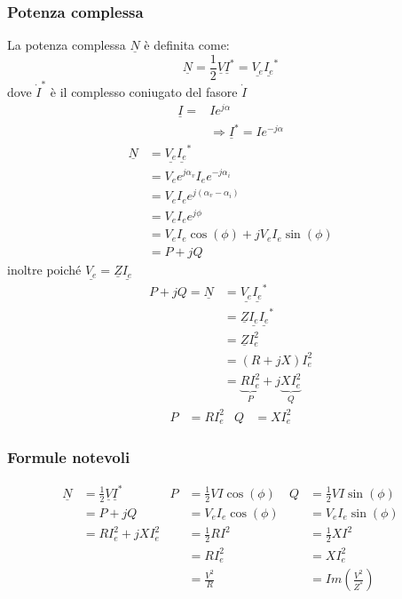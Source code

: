 \documentclass{article}
\begin{document}
\subsubsection{Potenza complessa}
La potenza complessa $\underline{N}$ è definita come:
\[\underline{N} = \frac{1}{2} \underline{V} \underline{I}^* = \underline{V_e} \underline{I_e}^*\]
dove $\dot I^*$ è il complesso coniugato del fasore $\dot I$
\begin{align*}
    \underline{I} =& I e^{j \alpha}
    \\
    &\Longrightarrow \underline{I}^* = I e^{-j \alpha}
\end{align*}
\begin{align*}
    \underline{N} &= \underline{V_e} \underline{I_e}^*\\
    &=V_ee^{j\alpha_v}I_e e^{-j \alpha_i} \\
    &=V_eI_e e^{j(\alpha_v-\alpha_i)}\\
    &=V_eI_e e^{j\phi}\\
    &= V_eI_e \cos(\phi) + jV_eI_e\sin(\phi)\\
    &= P+jQ
\end{align*}
inoltre poiché $\underline{V_e}=\underline{Z} \underline{I_e}$
\begin{align*}
    P+jQ=\underline{N} &= \underline{V_e} \underline{I_e}^*\\
    &=\underline{Z} \underline{I_e} \underline{I_e}^*\\
    &= \underline{Z} I_e^2\\
    &=(R+jX)I_e^2\\
    &=\underbrace{RI_e^2}_{P}+j\underbrace{XI_e^2}_{Q}
\end{align*}
\begin{align*}
    P &= RI_e^2 & Q &= XI_e^2
\end{align*}

\subsubsection{Formule notevoli}
\begin{align*}
    \underline{N} &= \frac{1}{2} \underline{V} \underline{I}^*
    &
    P &= \frac{1}{2}VI \cos(\phi)
    & 
    Q &= \frac{1}{2} VI \sin(\phi)
    \\
    &= P+jQ
    &
    &= V_eI_e \cos(\phi)
    &
    &=V_eI_e \sin(\phi)
    \\
    &=RI_e^2 + j XI_e^2
    &
    &= \frac{1}{2}RI^2
    &
    &= \frac{1}{2}XI^2
    \\
    & &
    &= RI_e^2
    &
    &= XI_e^2
    \\
    & &
    &=\frac{V^2}{R} &
    &=Im \left(\frac{V^2}{Z^*} \right)
\end{align*}
\end{document}

